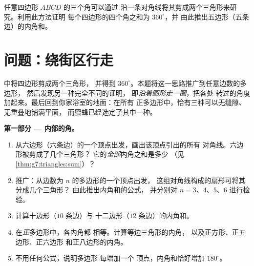 \begin{exercise}[$\star\star\star$]\label{exo:g7:triangles:11}
任意四边形 $ABCD$ 的三个角可以通过
沿一条对角线将其剪成两个三角形来研究。利用此方法证明
每个四边形的四个角之和为 $360^\circ$，并
由此推出五边形（五条边）的内角和。
\end{exercise}

\section{问题：绕街区行走}

\begin{problem}
\label{pb:g7:triangles:1}
中将四边形剪成两个三角形，
并得到 $360^\circ$。本题将这一思路推广到任意边数的多边形，
然后发现另一种完全不同的证明，
即\emph{沿着图形走一圈}，把各处
转过的角度加起来。最后回到你家浴室的地面：在所有
正多边形中，恰有三种可以无缝隙、无重叠地铺满平面，
而蜜蜂已经选定了其中一种。

\medskip
\noindent\textbf{第一部分 --- 内部的角。}
\begin{enumerate}
  \item 从六边形（六条边）的一个顶点出发，画出该顶点引出的所有
        对角线。六边形被剪成了几个三角形？
        它的\emph{全部}内角之和是多少
        （见\cref{thm:g7:triangles:sum}）？
  \item 推广：从边数为 $n$ 的多边形的一个顶点出发，
        这组对角线构成的扇形可将其分成几个三角形？
        由此推出内角和的公式，
        并分别对 $n = 3$、$4$、$5$、$6$ 进行检验。
  \item 计算十边形（$10$ 条边）与
        十二边形（$12$ 条边）的内角和。
  \item 在\emph{正}多边形中，各内角都
        相等。计算等边三角形的内角，
        以及正方形、正五边形、正六边形
        和正八边形的内角。
  \item 不用任何公式，说明多边形
        每增加一个
        顶点，内角和恰好增加 $180^\circ$。
\end{enumerate}


\end{problem}
